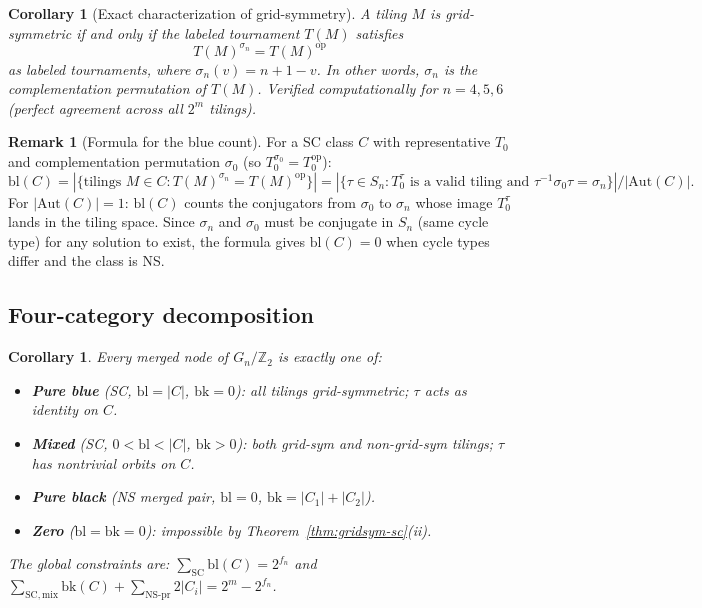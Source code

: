 \documentclass[12pt,reqno]{amsart}
\newtheorem{corollary}[theorem]{Corollary}
\theoremstyle{definition}
\newtheorem{remark}[theorem]{Remark}
\theoremstyle{plain}
\begin{document}
\begin{corollary}[Exact characterization of grid-symmetry]
A tiling $M$ is grid-symmetric if and only if the labeled tournament $T(M)$ satisfies
\[
  T(M)^{\sigma_n} = T(M)^{\mathrm{op}}
\]
as labeled tournaments, where $\sigma_n(v)=n+1-v$.
In other words, $\sigma_n$ is \emph{the} complementation permutation of $T(M)$.
Verified computationally for $n=4,5,6$ (perfect agreement across all $2^m$ tilings).
\end{corollary}

\begin{remark}[Formula for the blue count]
For a SC class $C$ with representative $T_0$ and complementation permutation $\sigma_0$
(so $T_0^{\sigma_0}=T_0^{\mathrm{op}}$):
\[
  \mathrm{bl}(C)
  = |\{\text{tilings }M\in C : T(M)^{\sigma_n}=T(M)^{\mathrm{op}}\}|
  = |\{\tau\in S_n : T_0^\tau\text{ is a valid tiling and }\tau^{-1}\sigma_0\tau=\sigma_n\}| / |\mathrm{Aut}(C)|.
\]
For $|\mathrm{Aut}(C)|=1$: $\mathrm{bl}(C)$ counts the conjugators from $\sigma_0$ to $\sigma_n$ whose
image $T_0^\tau$ lands in the tiling space.  Since $\sigma_n$ and $\sigma_0$ must be conjugate in $S_n$
(same cycle type) for any solution to exist, the formula gives $\mathrm{bl}(C)=0$ when cycle types differ
and the class is NS.
\end{remark}

\subsection{Four-category decomposition}

\begin{corollary}
Every merged node of $G_n/\mathbb{Z}_2$ is exactly one of:
\begin{itemize}
\item \textbf{Pure blue} (SC, $\mathrm{bl}=|C|$, $\mathrm{bk}=0$):
  all tilings grid-symmetric; $\tau$ acts as identity on $C$.
\item \textbf{Mixed} (SC, $0<\mathrm{bl}<|C|$, $\mathrm{bk}>0$):
  both grid-sym and non-grid-sym tilings; $\tau$ has nontrivial orbits on $C$.
\item \textbf{Pure black} (NS merged pair, $\mathrm{bl}=0$, $\mathrm{bk}=|C_1|+|C_2|$).
\item \textbf{Zero} ($\mathrm{bl}=\mathrm{bk}=0$): impossible by Theorem~\ref{thm:gridsym-sc}(ii).
\end{itemize}
The global constraints are:
$\sum_{\mathrm{SC}}\mathrm{bl}(C)=2^{f_n}$ and
$\sum_{\mathrm{SC,mix}}\mathrm{bk}(C)+\sum_{\mathrm{NS\text{-}pr}}2|C_i|=2^m-2^{f_n}$.
\end{corollary}
\end{document}
